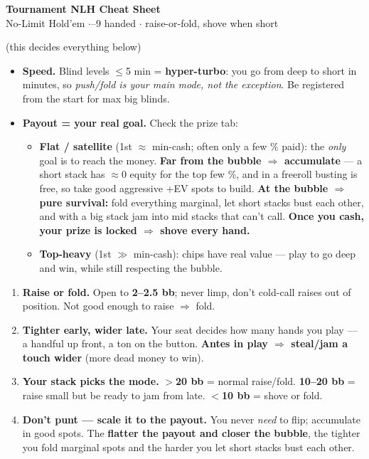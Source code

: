 \documentclass[11pt]{article}
\begin{document}
\begin{center}
{\LARGE\bfseries Tournament NLH Cheat Sheet}\\[2pt]
{\large No-Limit Hold'em \;$\cdot$--9 handed \;$\cdot$\; raise-or-fold, shove when short}
\end{center}
\vspace{2pt}

 \quad\small(this decides everything below)
\begin{itemize}[leftmargin=1.6em]
\item \textbf{Speed.} Blind levels $\le$5 min = \textbf{hyper-turbo}: you go from deep to short in minutes, so \emph{push/fold is your main mode, not the exception}. Be registered from the start for max big blinds.
\item \textbf{Payout = your real goal.} Check the prize tab:
\begin{itemize}[leftmargin=1.3em,label=$\circ$]
\item \textbf{Flat / satellite} (1st $\approx$ min-cash; often only a few \% paid): the \emph{only} goal is to reach the money. \textbf{Far from the bubble $\Rightarrow$ accumulate} --- a short stack has $\approx$0 equity for the top few \%, and in a freeroll busting is free, so take good aggressive +EV spots to build. \textbf{At the bubble $\Rightarrow$ pure survival:} fold everything marginal, let short stacks bust each other, and with a big stack jam into mid stacks that can't call. \textbf{Once you cash, your prize is locked $\Rightarrow$ shove every hand.}
\item \textbf{Top-heavy} (1st $\gg$ min-cash): chips have real value --- play to go deep and win, while still respecting the bubble.
\end{itemize}
\end{itemize}

\vspace{5pt}
\begin{enumerate}[leftmargin=1.6em]
\item \textbf{Raise or fold.} Open to \textbf{2--2.5 bb}; never limp, don't cold-call raises out of position. Not good enough to raise $\Rightarrow$ fold.
\item \textbf{Tighter early, wider late.} Your seat decides how many hands you play --- a handful up front, a ton on the button. \textbf{Antes in play $\Rightarrow$ steal/jam a touch wider} (more dead money to win).
\item \textbf{Your stack picks the mode.} \;\textbf{$>$20 bb} = normal raise/fold. \;\textbf{10--20 bb} = raise small but be ready to jam from late. \;\textbf{$<$10 bb} = shove or fold.
\item \textbf{Don't punt --- scale it to the payout.} You never \emph{need} to flip; accumulate in good spots. The \textbf{flatter the payout and closer the bubble}, the tighter you fold marginal spots and the harder you let short stacks bust each other.
\end{enumerate}
\end{document}
